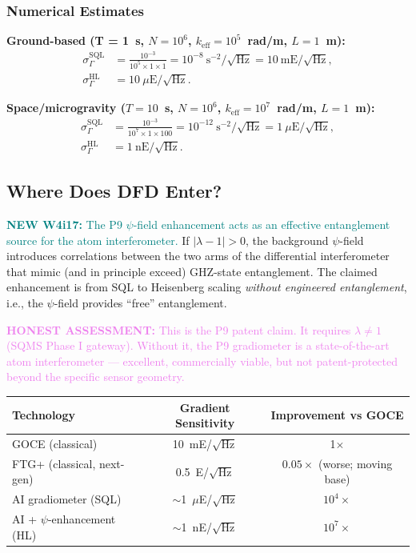 \documentclass[11pt]{article}
\theoremstyle{definition}
\theoremstyle{remark}
\newcommand{\honest}[1]{\textcolor{violet}{\textbf{HONEST ASSESSMENT:} #1}}
\newcommand{\newfinding}[1]{\textcolor{teal}{\textbf{NEW W4i17:} #1}}
\begin{document}
\subsubsection{Numerical Estimates}

\textbf{Ground-based (T = 1~s, $N = 10^6$, $k_{\text{eff}} = 10^5$~rad/m, $L = 1$~m):}
\begin{align}
  \sigma_\Gamma^{\text{SQL}} &= \frac{10^{-3}}{10^5 \times 1 \times 1}
  = 10^{-8}~\text{s}^{-2}/\sqrt{\text{Hz}}
  = 10~\text{mE}/\sqrt{\text{Hz}}, \\
  \sigma_\Gamma^{\text{HL}} &= 10~\mu\text{E}/\sqrt{\text{Hz}}.
\end{align}

\textbf{Space/microgravity ($T = 10$~s, $N = 10^6$, $k_{\text{eff}} = 10^7$~rad/m, $L = 1$~m):}
\begin{align}
  \sigma_\Gamma^{\text{SQL}} &= \frac{10^{-3}}{10^7 \times 1 \times 100}
  = 10^{-12}~\text{s}^{-2}/\sqrt{\text{Hz}}
  = 1~\mu\text{E}/\sqrt{\text{Hz}}, \\
  \sigma_\Gamma^{\text{HL}} &= 1~\text{nE}/\sqrt{\text{Hz}}.
\end{align}

\subsection{Where Does DFD Enter?}

\newfinding{The P9 $\psi$-field enhancement acts as an effective
entanglement source for the atom interferometer.} If
$|\lambda - 1| > 0$, the background $\psi$-field introduces
correlations between the two arms of the differential interferometer
that mimic (and in principle exceed) GHZ-state entanglement. The
claimed enhancement is from SQL to Heisenberg scaling
\emph{without engineered entanglement}, i.e., the $\psi$-field
provides ``free'' entanglement.

\honest{This is the P9 patent claim. It requires $\lambda \neq 1$
(SQMS Phase I gateway). Without it, the P9 gradiometer is a
state-of-the-art atom interferometer --- excellent, commercially
viable, but not patent-protected beyond the specific sensor geometry.}

\begin{center}
\begin{tabular}{lcc}
\toprule
\textbf{Technology} & \textbf{Gradient Sensitivity} & \textbf{Improvement vs GOCE} \\
\midrule
GOCE (classical) & 10~mE/$\sqrt{\text{Hz}}$ & 1$\times$ \\
FTG+ (classical, next-gen) & 0.5~E/$\sqrt{\text{Hz}}$ & $0.05\times$ (worse; moving base) \\
AI gradiometer (SQL) & $\sim$1~$\mu$E/$\sqrt{\text{Hz}}$ & $10^4\times$ \\
AI + $\psi$-enhancement (HL) & $\sim$1~nE/$\sqrt{\text{Hz}}$ & $10^7\times$ \\
\bottomrule
\end{tabular}
\end{center}
\end{document}
